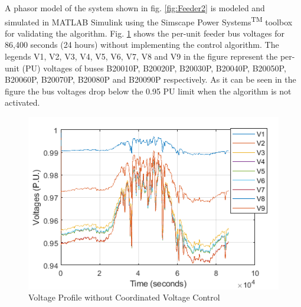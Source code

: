 A phasor model of the system shown in fig. \ref{fig:Feeder2} is modeled and simulated  in MATLAB\textsuperscript{\textregistered} Simulink\textsuperscript{\textregistered} using the Simscape Power Systems\textsuperscript{TM} toolbox for validating the algorithm. Fig. \ref{fig:without_vvc} shows the per-unit feeder bus voltages for 86,400 seconds (24 hours) without implementing the control algorithm. The legends V1, V2, V3, V4, V5, V6, V7, V8 and V9 in the figure represent the per-unit (PU) voltages of buses B20010P, B20020P, B20030P, B20040P, B20050P, B20060P, B20070P, B20080P and B20090P respectively. As it can be seen in the figure the bus voltages drop below the 0.95 PU limit when the algorithm is not activated.

\begin{figure}[!h]
\centering
\includegraphics[width=\linewidth]{figs/Without_VVC.png}
\caption{Voltage Profile without Coordinated Voltage Control}
\label{fig:without_vvc}
\end{figure}

